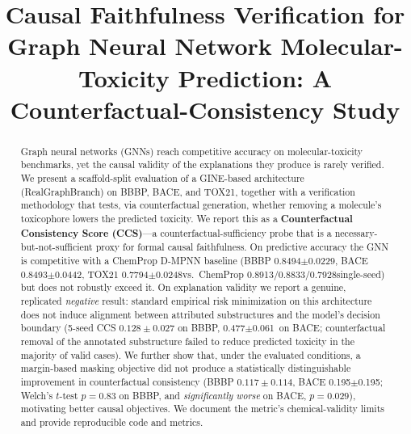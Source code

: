 \documentclass[journal]{IEEEtran}
\newcommand{\BBBPauc}{0.8494}  \newcommand{\BBBPaucsd}{0.0229}
\newcommand{\BACEauc}{0.8493}  \newcommand{\BACEaucsd}{0.0442}
\newcommand{\TOXauc}{0.7794}   \newcommand{\TOXaucsd}{0.0248}
\newcommand{\ChemBBBP}{0.8913} \newcommand{\ChemBACE}{0.8833}
\newcommand{\ChemTOX}{0.7928}  \newcommand{\ChemClin}{0.8407/0.8600}
\newcommand{\BACEcausalstd}{0.477} \newcommand{\BACEcausalstdsd}{0.061} %
\newcommand{\BACEcausalreg}{0.195} \newcommand{\BACEcausalregsd}{0.195} %
\begin{document}
\title{Causal Faithfulness Verification for Graph Neural Network
Molecular-Toxicity Prediction: A Counterfactual-Consistency Study}

\author{
}

\maketitle

\begin{abstract}
Graph neural networks (GNNs) reach competitive accuracy on molecular-toxicity
benchmarks, yet the causal validity of the explanations they produce is rarely
verified. We present a scaffold-split evaluation of a GINE-based architecture
(RealGraphBranch) on BBBP, BACE, and TOX21, together with a verification
methodology that tests, via counterfactual generation, whether removing a
molecule's toxicophore lowers the predicted toxicity. We report this as a
\textbf{Counterfactual Consistency Score (CCS)}---a counterfactual-sufficiency
probe that is a necessary-but-not-sufficient proxy for formal causal faithfulness.
On predictive accuracy the GNN is competitive with a ChemProp D-MPNN baseline
(BBBP \BBBPauc$\pm$\BBBPaucsd, BACE \BACEauc$\pm$\BACEaucsd, TOX21
\TOXauc$\pm$\TOXaucsd vs.\ ChemProp \ChemBBBP/\ChemBACE/\ChemTOX single-seed) but
does not robustly exceed it. On explanation validity we report a genuine,
replicated \emph{negative} result: standard empirical risk minimization on this
architecture does not induce alignment between attributed substructures and the
model's decision boundary (5-seed CCS $0.128\pm0.027$ on BBBP,
\BACEcausalstd$\pm$\BACEcausalstdsd\ on BACE; counterfactual removal of the
annotated substructure failed to reduce predicted toxicity in the majority of
valid cases). We further show that, under the evaluated conditions, a
margin-based masking objective did not produce a statistically distinguishable
improvement in counterfactual consistency (BBBP $0.117\pm0.114$, BACE
\BACEcausalreg$\pm$\BACEcausalregsd; Welch's $t$-test $p=0.83$ on BBBP, and
\emph{significantly worse} on BACE, $p=0.029$), motivating better causal
objectives. We document the metric's chemical-validity limits and provide
reproducible code and metrics.
\end{abstract}
\end{document}
